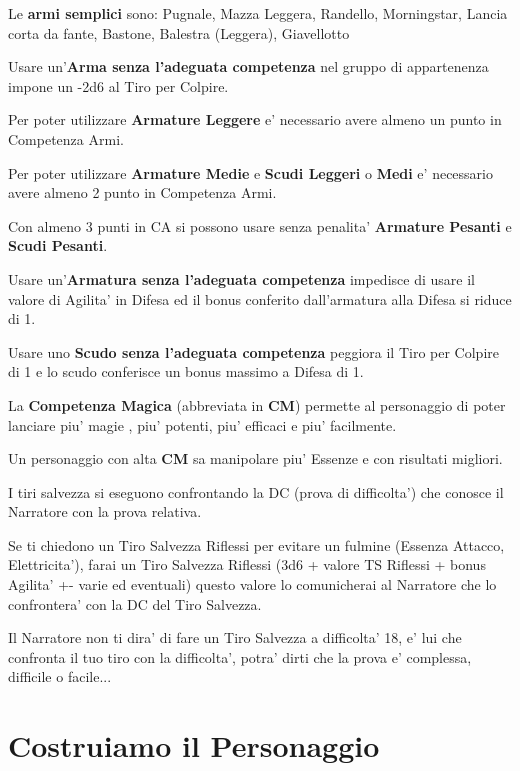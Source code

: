 \documentclass[a4paper,11pt,twoside,openany]{book}
\begin{document}
Le \textbf{armi semplici} sono: Pugnale, Mazza Leggera, Randello, Morningstar,
Lancia corta da fante, Bastone, Balestra (Leggera), Giavellotto

Usare un'\textbf{Arma senza l'adeguata competenza} nel gruppo di appartenenza impone un -2d6 al Tiro per Colpire.

Per poter utilizzare \textbf{Armature Leggere} e' necessario avere almeno un punto in Competenza Armi.

Per poter utilizzare \textbf{Armature Medie} e \textbf{Scudi Leggeri} o \textbf{Medi} e' necessario avere almeno 2 punto in Competenza Armi.

Con almeno 3 punti in CA si possono usare senza penalita' \textbf{Armature Pesanti} e \textbf{Scudi Pesanti}.

Usare un'\textbf{Armatura senza l'adeguata competenza} impedisce di usare il valore di Agilita' in Difesa ed il bonus conferito dall'armatura alla Difesa si riduce di 1.

Usare uno \textbf{Scudo senza l'adeguata competenza} peggiora il Tiro per Colpire di 1 e lo scudo conferisce un bonus massimo a Difesa di 1.

La \textbf{Competenza Magica} (abbreviata in \textbf{CM}) permette al personaggio di poter lanciare piu' magie , piu' potenti, piu' efficaci e piu' facilmente.

Un personaggio con alta \textbf{CM} sa manipolare piu' Essenze e con risultati migliori.

I tiri salvezza si eseguono confrontando la DC (prova di difficolta') che conosce il Narratore con la prova relativa.

Se ti chiedono un Tiro Salvezza Riflessi per evitare un fulmine (Essenza Attacco, Elettricita'), farai un Tiro Salvezza Riflessi (3d6 + valore TS Riflessi + bonus Agilita' +- varie ed eventuali) questo valore lo comunicherai al Narratore che lo confrontera' con la DC del Tiro Salvezza.

Il Narratore non ti dira' di fare un Tiro Salvezza a difficolta' 18, e' lui che confronta il tuo tiro con la difficolta', potra' dirti che la prova e' complessa, difficile o facile...


\pagebreak

\section{Costruiamo il Personaggio}
\end{document}
